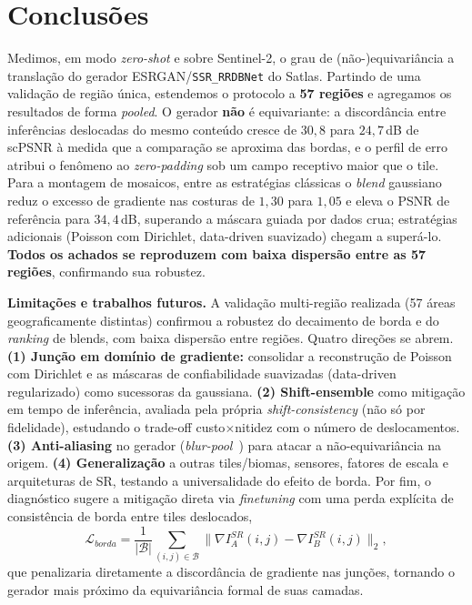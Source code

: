 \documentclass[conference]{IEEEtran}
\begin{document}
\section{Conclusões}
\label{sec:conclusao}
Medimos, em modo \emph{zero-shot} e sobre Sentinel-2, o grau de (não-)equivariância a
translação do gerador ESRGAN/\texttt{SSR\_RRDBNet} do Satlas. Partindo de uma validação
de região única, estendemos o protocolo a \textbf{57 regiões} e agregamos os resultados
de forma \emph{pooled}. O gerador \textbf{não} é equivariante: a discordância entre
inferências deslocadas do mesmo conteúdo cresce de $30{,}8$ para $24{,}7$\,dB de scPSNR
à medida que a comparação se aproxima das bordas, e o perfil de erro atribui o fenômeno
ao \textit{zero-padding} sob um campo receptivo maior que o tile. Para a montagem de
mosaicos, entre as estratégias clássicas o \textit{blend} gaussiano reduz o excesso de
gradiente nas costuras de $1{,}30$ para $1{,}05$ e eleva o PSNR de referência para
$34{,}4$\,dB, superando a máscara guiada por dados crua; estratégias adicionais (Poisson
com Dirichlet, data-driven suavizado) chegam a superá-lo. \textbf{Todos os achados se
reproduzem com baixa dispersão entre as 57 regiões}, confirmando sua robustez.

\textbf{Limitações e trabalhos futuros.} A validação multi-região realizada (57 áreas
geograficamente distintas) confirmou a robustez do decaimento de borda e do
\textit{ranking} de blends, com baixa dispersão entre regiões. Quatro direções se abrem.
\textbf{(1) Junção em domínio de gradiente:} consolidar a reconstrução de Poisson com
Dirichlet e as máscaras de confiabilidade suavizadas (data-driven regularizado) como
sucessoras da gaussiana. \textbf{(2) Shift-ensemble} como mitigação em tempo de
inferência, avaliada pela própria \textit{shift-consistency} (não só por fidelidade),
estudando o trade-off custo$\times$nitidez com o número de deslocamentos.
\textbf{(3) Anti-aliasing} no gerador (\textit{blur-pool}~\cite{b_shiftinv}) para atacar
a não-equivariância na origem. \textbf{(4) Generalização} a outras tiles/biomas, sensores,
fatores de escala e arquiteturas de SR, testando a universalidade do efeito de borda.
Por fim, o diagnóstico sugere a mitigação direta via \textit{finetuning} com uma perda
explícita de consistência de borda entre tiles deslocados,
\begin{equation}
\mathcal{L}_{borda} = \frac{1}{|\mathcal{B}|}\sum_{(i,j)\in\mathcal{B}}
\bigl\|\nabla I^{SR}_A(i,j) - \nabla I^{SR}_B(i,j)\bigr\|_2,
\label{eq:borda}
\end{equation}
que penalizaria diretamente a discordância de gradiente nas junções, tornando o gerador
mais próximo da equivariância formal de suas camadas.
\end{document}

